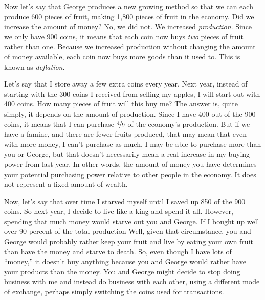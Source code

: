 Now let’s say that George produces a new growing method so that we can
each produce 600 pieces of fruit,
making 1,800 pieces
of fruit in the economy. Did we increase the amount of money?  No, we
did not. We increased \textit{production}. Since we only have 900
coins, it means that each coin now buys \textit{two} pieces of fruit
rather than one.  Because we increased production without changing
the amount of money available, each coin now buys more goods than it
used to.  This is known as \textit{deflation}.

Let’s say that I store away a few extra coins every year. Next year,
instead of starting with the 300 coins I received from selling my
apples, I will start out with 400 coins. How many pieces of fruit will
this buy me? The answer is, quite simply, it depends on the amount of
production. Since I have 400 out of the 900 coins, it means that I can
purchase $\nicefrac{4}{9}$ of the economy’s production. But if we have a famine, and
there are fewer fruits produced, that may mean that even with more
money, I can’t purchase as much. I may be able to purchase more than
you or George, but that doesn’t necessarily mean a real increase in my
buying power from last year.  In other words, the amount of money you
have determines your potential purchasing power relative to other people
in the economy.  It does not represent a fixed amount of wealth.

Now, let’s say that over time I starved myself until I saved up 850 of
the 900 coins. So next year, I decide to live like a king and spend it
all.  However, spending that much money would starve out you and George. If
I bought up well over 90 percent of the total production Well,
given that circumstance, you and George would probably rather keep your fruit 
and live by eating your own fruit than have the money and starve to death. 
So, even though I have lots of “money,” it doesn’t buy
anything because you and George would rather have your products than
the money. You and George might decide to stop doing business with me
and instead do business with each other, using a different mode of
exchange, perhaps simply switching the coins used for transactions.

